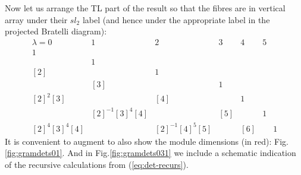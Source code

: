 
%
%
%



%


Now let us arrange the TL part of the result so that
the fibres are in vertical array under their $sl_2$ label
(and hence under the appropriate label in the projected Bratelli diagram): 
\[
\begin{array}{ccccccccccc}
  \lambda=0         &  1             &  2      &  3  &  4  &  5   %
  \\ \hline
  1 \\ 
                   & 1  \\ 
   {[2]}           &                    & 1 \\ 
                  & [3]                &     & 1   \\ 
  {[ 2]}^2 [3]    &                     & [4] &      &  1  \\
                  & {[2]}^{-1} [3]^4 [4] &     & [5]   &    & 1 \\ 
{[2]}^4 [3]^4 [4]  &                    & {[2]}^{-1}[4]^5[5] &    & [6] & & 1 
\end{array}
\]
It is convenient to augment to also show the module dimensions (in red):
Fig.\ref{fig:gramdets01}.
And in Fig.\ref{fig:gramdets031} we include a schematic indication of the
recursive calculations from (\ref{eq:det-recurs}). 

